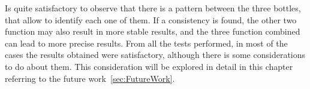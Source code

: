 Is quite satisfactory to observe that there is a pattern between the three bottles, that allow to identify each one of them. If a consistency is found, the other two function may also result in more stable results, and the three function combined can lead to more precise results.
From all the tests performed, in most of the cases the results obtained were satisfactory, although there is some considerations to do about them. This consideration will be explored in detail in this chapter referring to the future work~\ref{sec:FutureWork}.


\clearpage
